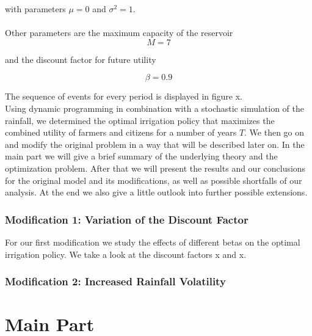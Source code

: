 \documentclass[12pt, a4paper, oneside]{article}
\begin{document}
with parameters $\mu = 0$ and $\sigma^2 = 1$.\\\\

Other parameters are the maximum capacity of the reservoir
\begin{equation}
	M = 7
\end{equation}

and the discount factor for future utility 

\begin{equation}
	\beta = 0.9
\end{equation}

The sequence of events for every period is displayed in figure x. \\

Using dynamic programming in combination with a stochastic simulation of the rainfall, we determined the optimal irrigation policy that maximizes the combined utility of farmers and citizens for a number of years $T$.
We then go on and modify the original problem in a way that will be described later on. 
In the main part we will give a brief summary of the underlying theory and the optimization problem.
After that we will present the results and our conclusions for the original model and its modifications, as well as possible shortfalls of our analysis.
At the end we also give a little outlook into further possible extensions.


\subsubsection{Modification 1: Variation of the Discount Factor}
For our first modification we study the effects of different betas on the optimal irrigation policy. We take a look at the discount factors x and x.

\subsubsection{Modification 2: Increased Rainfall Volatility}


	
	\section{Main Part}
\end{document}
